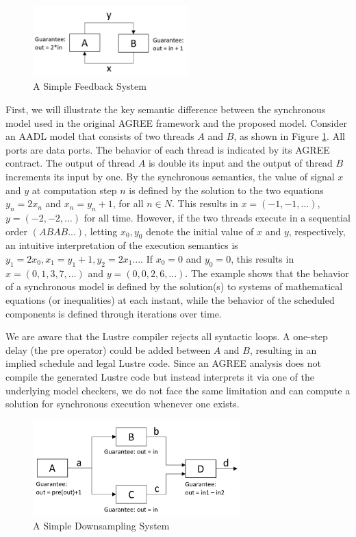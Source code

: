 \begin{figure}[t!]
\centering
\includegraphics[width=60mm]{simpleFeedback.jpg}
\caption{A Simple Feedback System\label{motivationFig1}}
\end{figure}

First, we will illustrate the key semantic difference between the synchronous model used in the original AGREE framework and the proposed model.
Consider an AADL model that consists of two threads $A$ and $B$, as shown in Figure \ref{motivationFig1}. All ports are data ports. The behavior of each thread is indicated by its AGREE contract. The output of thread $A$ is double its input and the output of thread $B$ increments its input by one. By the synchronous semantics, the value of signal $x$ and $y$ at computation step $n$ is defined by the solution to the two equations $y_n = 2x_n$ and $x_n = y_n+1$, for all $n \in N$. This results in $x = (-1, -1, …)$, $y = (-2, -2, …)$ for all time. However, if the two threads execute in a sequential order $(ABAB...)$, letting $x_0, y_0$ denote the initial value of $x$ and $y$, respectively, an intuitive interpretation of the execution semantics is $y_1 = 2x_0, x_1 = y_1+1, y_2 = 2x_1...$. If $x_0 = 0$ and  $y_0 = 0$, this results in $x = (0, 1, 3, 7,…)$ and $y = (0, 0, 2, 6, …)$. The example shows that the behavior of a synchronous model is defined by the solution(s) to systems of mathematical equations (or inequalities) at each instant, while the behavior of the scheduled components is defined through iterations over time.  

We are aware that the Lustre compiler rejects all syntactic loops.  A one-step delay (the \textsf{pre} operator) could be added between $A$ and $B$, resulting in an implied schedule and legal Lustre code. Since an AGREE analysis does not compile the generated Lustre code but instead interprets it via one of the underlying model checkers, we do not face the same limitation and can compute a solution for synchronous execution whenever one exists.  

\begin{figure}[t!]
\centering
\includegraphics[width=80mm]{downsample.jpg}
\caption{A Simple Downsampling System\label{motivationFig2}}
\end{figure}

